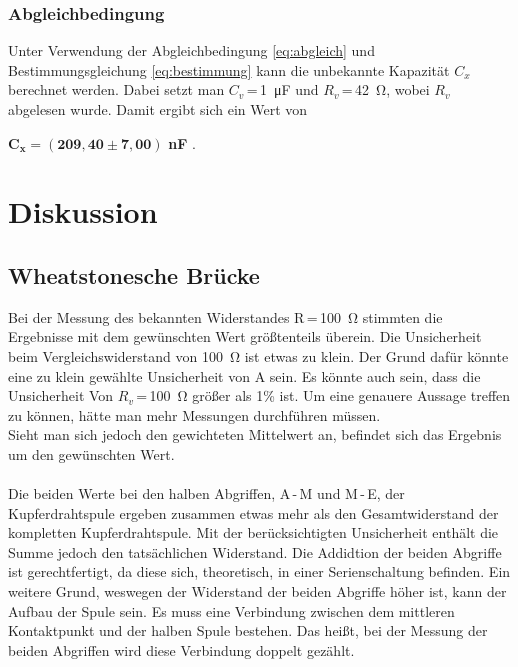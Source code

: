 \documentclass[a4paper,usenatbib]{aspdoc}
\begin{document}
            \subsubsection{Abgleichbedingung}
                Unter Verwendung der Abgleichbedingung \ref{eq:abgleich} und Bestimmungsgleichung \ref{eq:bestimmung} kann die unbekannte Kapazität $C_x$ berechnet werden. Dabei setzt man $C_v$\,=\,\SI{1}{\micro\farad} und $R_v$\,=\,\SI{42}{\ohm}, wobei $R_v$ abgelesen wurde. Damit ergibt sich ein Wert von
                \begin{center}
                    $\mathbf{C_x = (209,40 \pm 7,00)}$ \textbf{nF} .
                \end{center}

            
    \section{Diskussion}\label{sec:discussion}
        \subsection{Wheatstonesche Brücke}\label{subsec:discussion_wheatstone}
            Bei der Messung des bekannten Widerstandes R\,=\,\SI{100}{\ohm} stimmten die Ergebnisse mit dem gewünschten Wert größtenteils überein. Die Unsicherheit beim Vergleichswiderstand von \SI{100}{\ohm} ist etwas zu klein. Der Grund dafür könnte eine zu klein gewählte Unsicherheit von A sein. Es könnte auch sein, dass die Unsicherheit Von $R_v$\,=\,\SI{100}{\ohm} größer als 1\% ist. Um eine genauere Aussage treffen zu können, hätte man mehr Messungen durchführen müssen. \\
            Sieht man sich jedoch den gewichteten Mittelwert an, befindet sich das Ergebnis um den gewünschten Wert.\\
            \\
            Die beiden Werte bei den halben Abgriffen, A\,-\,M und M\,-\,E,  der Kupferdrahtspule ergeben zusammen etwas mehr als den Gesamtwiderstand der kompletten Kupferdrahtspule. Mit der berücksichtigten Unsicherheit enthält die Summe jedoch den tatsächlichen Widerstand. Die Addidtion der beiden Abgriffe ist gerechtfertigt, da diese sich, theoretisch, in einer Serienschaltung befinden. Ein weitere Grund, weswegen der Widerstand der beiden Abgriffe höher ist, kann der Aufbau der Spule sein. Es muss eine Verbindung zwischen dem mittleren Kontaktpunkt und der halben Spule bestehen. Das heißt, bei der Messung der beiden Abgriffen wird diese Verbindung doppelt gezählt.
            
\end{document}
